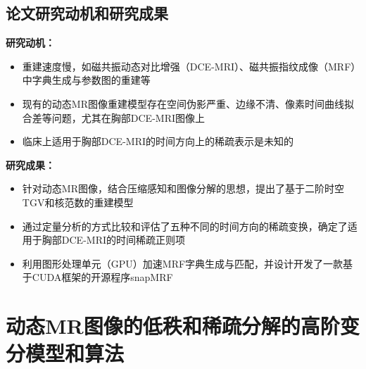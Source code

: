 \documentclass{beamer}
\begin{document}

\subsection{论文研究动机和研究成果}
\begin{frame}
\textbf{研究动机：}
	\begin{itemize}
		\item 重建速度慢，如磁共振动态对比增强（DCE-MRI）、磁共振指纹成像（MRF）中字典生成与参数图的重建等
		\item 现有的动态MR图像重建模型存在空间伪影严重、边缘不清、像素时间曲线拟合差等问题，尤其在胸部DCE-MRI图像上
		\item 临床上适用于胸部DCE-MRI的时间方向上的稀疏表示是未知的
	\end{itemize}
	\textbf{研究成果：}
	\begin{itemize}
		\item 针对动态MR图像，结合压缩感知和图像分解的思想，提出了基于二阶时空TGV和核范数的重建模型
		\item 通过定量分析的方式比较和评估了五种不同的时间方向的稀疏变换，确定了适用于胸部DCE-MRI的时间稀疏正则项
		\item 利用图形处理单元（GPU）加速MRF字典生成与匹配，并设计开发了一款基于CUDA框架的开源程序snapMRF
	\end{itemize}
\end{frame}

\section{动态MR图像的低秩和稀疏分解的高阶变分模型和算法}
    \begin{frame}
    \end{frame}
\end{document}
